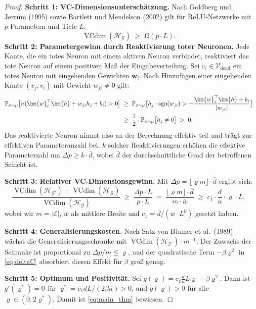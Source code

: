 \documentclass[12pt, a4paper, openany]{report}
\newcommand{\Prob}{\mathbb{P}}
\newcommand{\calG}{\mathcal{G}}
\newcommand{\calH}{\mathcal{H}}
\newcommand{\calV}{\mathcal{V}}
\newcommand{\calE}{\mathcal{E}}
\DeclareMathOperator{\sgn}{sgn}
\DeclareMathOperator{\VC}{VCdim}
\begin{document}
\begin{proof}
\textbf{Schritt 1: VC-Dimensionsunterschätzung.}
Nach Goldberg und Jerrum (1995) sowie Bartlett und Mendelson (2002) gilt
für ReLU-Netzwerke mit $p$ Parametern und Tiefe $L$:
\begin{equation}
  \label{eq:vc_base}
  \VC(\calH_{\calG}) \;\geq\; \Omega(p \cdot L).
\end{equation}
\textbf{Schritt 2: Parametergewinn durch Reaktivierung toter Neuronen.}
Jede Kante, die ein totes Neuron mit einem aktiven Neuron verbindet,
reaktiviert das tote Neuron auf einem positiven Maß der Eingabeverteilung.
Sei $v_i \in \calV_{\mathrm{dead}}$ ein totes Neuron mit eingehenden
Gewichten $\bm{w}_i$.  Nach Hinzufügen einer eingehenden Kante
$(v_j, v_i)$ mit Gewicht $w_{ji} \neq 0$ gilt:
\begin{align}
  \Prob_{x \sim \mu}\bigl[\sigma(\bm{w}_i^\top\bm{h} + w_{ji} h_j + b_i) > 0\bigr]
  &\;\geq\;
  \Prob_{x \sim \mu}\bigl[h_j \cdot \sgn(w_{ji}) > -\frac{\bm{w}_i^\top \bm{h} + b_i}{|w_{ji}|}\bigr] \notag \\
  &\;\geq\;
  \frac{1}{2} \cdot \Prob_{x \sim \mu}\bigl[h_j \neq 0\bigr]
  \;>\; 0.
\end{align}
Das reaktivierte Neuron nimmt also an der Berechnung effektiv teil und
trägt zur effektiven Parameteranzahl bei.  $k$ solcher Reaktivierungen
erhöhen die effektive Parameterzahl um $\Delta p \geq k \cdot \bar{d}$,
wobei $\bar{d}$ der durchschnittliche Grad der betroffenen Schicht ist.

\textbf{Schritt 3: Relativer VC-Dimensionsgewinn.}
Mit $\Delta p = \lfloor \varrho m \rfloor \cdot \bar{d}$ ergibt sich:
\begin{equation}
  \label{eq:vc_gain}
  \frac{\VC(\calH_{\calG'}) - \VC(\calH_{\calG})}{\VC(\calH_{\calG})}
  \;\geq\;
  \frac{\Delta p \cdot L}{p \cdot L}
  \;=\;
  \frac{\lfloor\varrho m\rfloor \cdot \bar{d}}{m \cdot \bar{w}}
  \;\geq\;
  c_1 \cdot \frac{d}{n} \cdot \varrho \cdot L,
\end{equation}
wobei wir $m = |\calE|$, $\bar{w}$ als mittlere Breite und
$c_1 = \bar{d}/(\bar{w} \cdot L^0)$ gesetzt haben.

\textbf{Schritt 4: Generalisierungskosten.}
Nach Satz von Blumer et al.\ (1989) wächst die Generalisierungsschranke
mit $\VC(\calH_{\calG'}) \cdot m^{-1}$.  Der Zuwachs der Schranke ist
proportional zu $\Delta p / m \leq \varrho$, und der quadratische Term
$-\beta\varrho^2$ in \eqref{eq:deltaC} absorbiert diesen Effekt für
$\beta$ groß genug.

\textbf{Schritt 5: Optimum und Positivität.}
Sei $g(\varrho) = c_1 \frac{d}{n} L \varrho - \beta \varrho^2$.
Dann ist $g'(\varrho^*) = 0$ für $\varrho^* = c_1 d L / (2\beta n) > 0$,
und $g(\varrho) > 0$ für alle $\varrho \in (0, 2\varrho^*)$.
Damit ist \eqref{eq:main_thm} bewiesen.
\end{proof}
\end{document}
